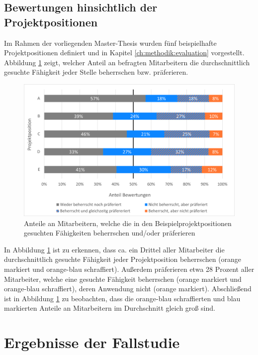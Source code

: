 \subsection{Bewertungen hinsichtlich der Projektpositionen}
\label{ch:ergebnisse:analyse:projektpositionen}
Im Rahmen der vorliegenden Master-Thesis wurden fünf beispielhafte Projektpositionen definiert und in Kapitel \ref{ch:methodik:evaluation} vorgestellt. Abbildung \ref{fig:ergebnisse:analyse:abb5} zeigt, welcher Anteil an befragten Mitarbeitern die durchschnittlich gesuchte Fähigkeit jeder Stelle beherrschen bzw. präferieren.

\begin{figure}[h]
	\centering
	\includegraphics[width=1\textwidth]{gfx/anteil-bewertungen-je-projektposition.png}
	\caption{Anteile an Mitarbeitern, welche die in den Beispielprojektpositionen gesuchten Fähigkeiten beherrschen und/oder präferieren}
	\label{fig:ergebnisse:analyse:abb5}
\end{figure}

In Abbildung \ref{fig:ergebnisse:analyse:abb5} ist zu erkennen, dass ca. ein Drittel aller Mitarbeiter die durchschnittlich gesuchte Fähigkeit jeder Projektposition beherrschen (orange markiert und orange-blau schraffiert). Außerdem präferieren etwa 28 Prozent aller Mitarbeiter, welche eine gesuchte Fähigkeit beherrschen (orange markiert und orange-blau schraffiert), deren Anwendung nicht (orange markiert). Abschließend ist in Abbildung \ref{fig:ergebnisse:analyse:abb5} zu beobachten, dass die orange-blau schraffierten und blau markierten Anteile an Mitarbeitern im Durchschnitt gleich groß sind.

\newpage
\section{Ergebnisse der Fallstudie}
\label{ch:ergebnisse:fallstudie}

